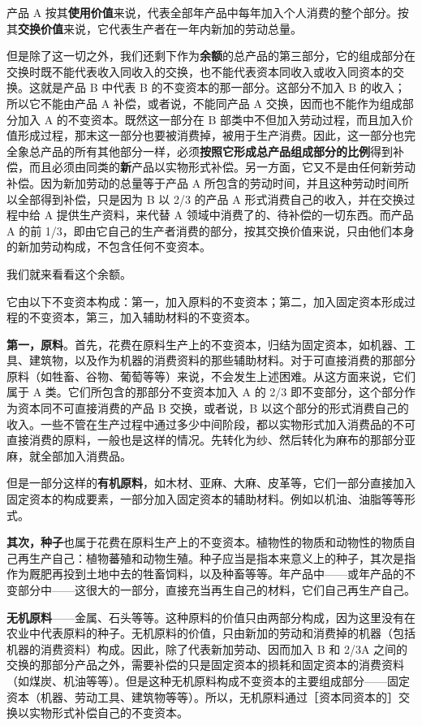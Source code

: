 产品 A 按其\textbf{使用价值}来说，代表全部年产品中每年加入个人消费的整个部分。按其\textbf{交换价值}来说，它代表生产者在一年内新加的劳动总量。

但是除了这一切之外，我们还剩下作为\textbf{余额}的总产品的第三部分，它的组成部分在交换时既不能代表收入同收入的交换，也不能代表资本同收入或收入同资本的交换。这就是产品 B 中代表 B 的不变资本的那一部分。这部分不加入 B 的收入；所以它不能由产品 A 补偿，或者说，不能同产品 A 交换，因而也不能作为组成部分加入 A 的不变资本。既然这一部分在 B 部类中不但加入劳动过程，而且加入价值形成过程，那末这一部分也要被消费掉，被用于生产消费。因此，这一部分也完全象总产品的所有其他部分一样，必须\textbf{按照它形成总产品组成部分的比例}得到补偿，而且必须由同类的\textbf{新}产品以实物形式补偿。另一方面，它又不是由任何新劳动补偿。因为新加劳动的总量等于产品 A 所包含的劳动时间，并且这种劳动时间所以全部得到补偿，只是因为 B 以 2/3 的产品 A 形式消费自己的收入，并在交换过程中给 A 提供生产资料，来代替 A 领域中消费了的、待补偿的一切东西。而产品 A 的前 1/3，即由它自己的生产者消费的部分，按其交换价值来说，只由他们本身的新加劳动构成，不包含任何不变资本。

我们就来看看这个余额。

它由以下不变资本构成：第一，加入原料的不变资本；第二，加入固定资本形成过程的不变资本，第三，加入辅助材料的不变资本。

\textbf{第一，原料}。首先，花费在原料生产上的不变资本，归结为固定资本，如机器、工具、建筑物，以及作为机器的消费资料的那些辅助材料。对于可直接消费的那部分原料（如牲畜、谷物、葡萄等等）来说，不会发生上述困难。从这方面来说，它们属于 A 类。它们所包含的那部分不变资本加入 A 的 2/3 即不变部分，这个部分作为资本同不可直接消费的产品 B 交换，或者说，B 以这个部分的形式消费自己的收入。一些不管在生产过程中通过多少中间阶段，都以实物形式加入消费品的不可直接消费的原料，一般也是这样的情况。先转化为纱、然后转化为麻布的那部分亚麻，就全部加入消费品。

但是一部分这样的\textbf{有机原料}，如木材、亚麻、大麻、皮革等，它们一部分直接加入固定资本的构成要素，一部分加入固定资本的辅助材料。例如以机油、油脂等等形式。

\textbf{其次，种子}也属于花费在原料生产上的不变资本。植物性的物质和动物性的物质自己再生产自己：植物蕃殖和动物生殖。种子应当是指本来意义上的种子，其次是指作为厩肥再投到土地中去的牲畜饲料，以及种畜等等。年产品中——或年产品的不变部分中——这很大的一部分，直接充当再生自己的材料，它们自己再生产自己。

\textbf{无机原料}——金属、石头等等。这种原料的价值只由两部分构成，因为这里没有在农业中代表原料的种子。无机原料的价值，只由新加的劳动和消费掉的机器（包括机器的消费资料）构成。因此，除了代表新加劳动、因而加入 B 和 2/3A 之间的交换的那部分产品之外，需要补偿的只是固定资本的损耗和固定资本的消费资料（如煤炭、机油等等）。但是这种无机原料构成不变资本的主要组成部分——固定资本（机器、劳动工具、建筑物等等）。所以，无机原料通过［资本同资本的］交换以实物形式补偿自己的不变资本。

